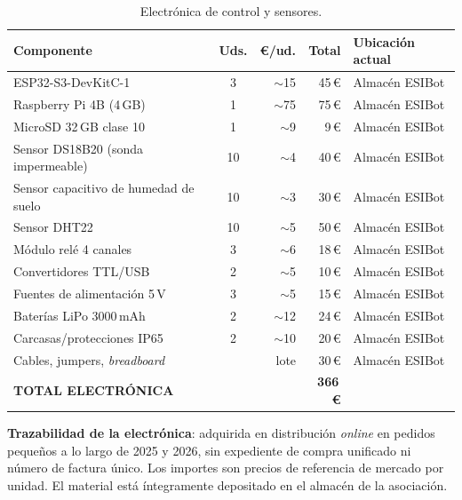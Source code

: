 \begin{table}[H]
    \centering
    \caption{Electr\'onica de control y sensores.}
    \label{tab:inventario_electronico}
    \begin{tabular}{p{5.2cm}crrp{2.6cm}}
        \toprule
        \textbf{Componente} & \textbf{Uds.} & \textbf{\euro/ud.} & \textbf{Total} & \textbf{Ubicaci\'on actual} \\
        \midrule
        ESP32-S3-DevKitC-1                     & 3  & $\sim$15 & 45\,\euro & Almac\'en \mbox{ESIBot} \\
        Raspberry Pi 4B (4\,GB)                & 1  & $\sim$75 & 75\,\euro & Almac\'en \mbox{ESIBot} \\
        MicroSD 32\,GB clase 10                & 1  & $\sim$9  & 9\,\euro  & Almac\'en \mbox{ESIBot} \\
        Sensor DS18B20 (sonda impermeable)     & 10 & $\sim$4  & 40\,\euro & Almac\'en \mbox{ESIBot} \\
        Sensor capacitivo de humedad de suelo  & 10 & $\sim$3  & 30\,\euro & Almac\'en \mbox{ESIBot} \\
        Sensor DHT22                           & 10 & $\sim$5  & 50\,\euro & Almac\'en \mbox{ESIBot} \\
        M\'odulo rel\'e 4 canales              & 3  & $\sim$6  & 18\,\euro & Almac\'en \mbox{ESIBot} \\
        Convertidores TTL/USB                  & 2  & $\sim$5  & 10\,\euro & Almac\'en \mbox{ESIBot} \\
        Fuentes de alimentaci\'on 5\,V         & 3  & $\sim$5  & 15\,\euro & Almac\'en \mbox{ESIBot} \\
        Bater\'ias LiPo 3000\,mAh              & 2  & $\sim$12 & 24\,\euro & Almac\'en \mbox{ESIBot} \\
        Carcasas/protecciones IP65             & 2  & $\sim$10 & 20\,\euro & Almac\'en \mbox{ESIBot} \\
        Cables, jumpers, \textit{breadboard}   & \multicolumn{2}{r}{lote} & 30\,\euro & Almac\'en \mbox{ESIBot} \\
        \midrule
        \textbf{TOTAL ELECTR\'ONICA}           & \multicolumn{2}{r}{}     & \textbf{366\,\euro} & \\
        \bottomrule
    \end{tabular}
\end{table}

\textbf{Trazabilidad de la electr\'onica}: adquirida en distribuci\'on
\textit{online} en pedidos peque\~nos a lo largo de 2025 y 2026, sin
expediente de compra unificado ni n\'umero de factura \'unico. Los
importes son precios de referencia de mercado por unidad. El material
est\'a \'integramente depositado en el almac\'en de la asociaci\'on.

